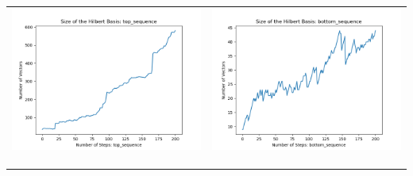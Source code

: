 \documentclass[10pt]{article}
\begin{document}
\begin{tabular}{c|c}
\begin{minipage}{.45\textwidth}
\includegraphics[width=\textwidth]{"DATA/5d/6 generators 2 bound G/top_sequence SIZE"}
\end{minipage} &
\begin{minipage}{.45\textwidth}
\includegraphics[width=\textwidth]{"DATA/5d/6 generators 2 bound G bottomup/bottom_sequence SIZE"}
\end{minipage} \\ \\
\hline \\\begin{minipage}{.45\textwidth}

\end{minipage}
\end{tabular}
\end{document}
